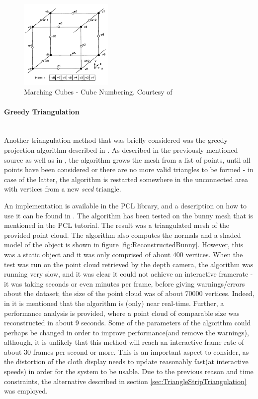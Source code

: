 \documentclass[]{article}
\begin{document}
\begin{figure}[hbtp]
    \centering
    \includegraphics[width=0.4\textwidth]{figures/MarchingCubesNumbering.PNG}
    \caption{Marching Cubes - Cube Numbering. Courtesy of \cite{william87}}
    \label{fig:MarchingCubesLabeling}
\end{figure}



\paragraph{Greedy Triangulation}\mbox{}\\

Another triangulation method that was briefly considered was the greedy projection algorithm described in \cite{Marton09ICRA}. As described in the previously mentioned source as well as in \cite{navpreet2013}, the algorithm grows the mesh from a list of points, until all points have been considered or there are no more valid triangles to be formed - in case of the latter, the algorithm is restarted somewhere in the unconnected area with vertices from a new \textit{seed} triangle.

An implementation is available in the PCL library, and a description on how to use it can be found in \cite{PCLGreedy}. The algorithm has been tested on the bunny mesh that is mentioned in the PCL tutorial. The result was a triangulated mesh of the provided point cloud. The algorithm also computes the normals and a shaded model of the object is shown in figure \ref{fig:ReconstructedBunny}. However, this was a static object and it was only comprised of about 400 vertices. When the test was run on the point cloud retrieved by the depth camera, the algorithm was running very slow, and it was clear it could not achieve an interactive framerate - it was taking seconds or even minutes per frame, before giving warnings/errors about the dataset; the size of the point cloud was of about 70000 vertices. Indeed, in \cite{Marton09ICRA} it is mentioned that the algorithm is (only) near real-time. Further, a performance analysis is provided, where a point cloud of comparable size was reconstructed in about 9 seconds. Some of the parameters of the algorithm could perhaps be changed in order to improve performance(and remove the warnings), although, it is unlikely that this method will reach an interactive frame rate of about 30 frames per second or more. This is an important aspect to consider, as the distortion of the cloth display needs to update reasonably fast(at interactive speeds) in order for the system to be usable. Due to the previous reason and time constraints, the alternative described in section  \ref{sec:TriangleStripTriangulation} was employed.
\end{document}
